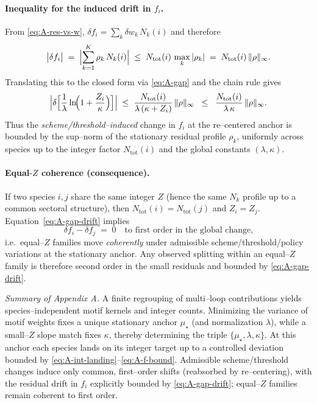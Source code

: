 \documentclass[epjc3]{svjour3}
\begin{document}
\paragraph{Inequality for the induced drift in $f_i$.}
From \eqref{eq:A-res-vs-w}, $\delta f_i=\sum_k \delta w_k\,N_k(i)$ and therefore
\begin{equation}
  \bigl|\delta f_i\bigr|
  \;=\;\Bigl|\sum_{k=1}^K \rho_k\,N_k(i)\Bigr|
  \;\le\; N_{\mathrm{tot}}(i)\,\max_k|\rho_k|
  \;=\;N_{\mathrm{tot}}(i)\,\|\rho\|_{\infty}.
  \label{eq:A-fi-drift}
\end{equation}
Translating this to the closed form via \eqref{eq:A-gap} and the chain rule gives
\begin{equation}
  \Bigl|\delta\Bigl[\frac{1}{\lambda}\ln\!\Bigl(1+\frac{Z_i}{\kappa}\Bigr)\Bigr]\Bigr|
  \;\le\;\frac{N_{\mathrm{tot}}(i)}{\lambda\,(\kappa+Z_i)}\,\|\rho\|_{\infty}
  \;\;\le\;\;\frac{N_{\mathrm{tot}}(i)}{\lambda\,\kappa}\,\|\rho\|_{\infty}.
  \label{eq:A-gap-drift}
\end{equation}
Thus the \emph{scheme/threshold--induced} change in $f_i$ at the re--centered anchor is bounded by the sup--norm of the stationary residual profile $\rho_k$, uniformly across species up to the integer factor $N_{\mathrm{tot}}(i)$ and the global constants $(\lambda,\kappa)$.

\paragraph{Equal\texorpdfstring{$\text{-}Z$}{-Z} coherence (consequence).}
If two species $i,j$ share the same integer $Z$ (hence the same $N_k$ profile up to a common sectoral structure), then $N_{\mathrm{tot}}(i)=N_{\mathrm{tot}}(j)$ and $Z_i=Z_j$. Equation~\eqref{eq:A-gap-drift} implies
\begin{equation}
  \delta f_i-\delta f_j\;=\;0\quad\text{to first order in the global change,}
  \label{eq:A-equalZ-coherence}
\end{equation}
i.e.\ equal--$Z$ families move \emph{coherently} under admissible scheme/threshold/policy variations at the stationary anchor. Any observed splitting within an equal--$Z$ family is therefore second order in the small residuals and bounded by \eqref{eq:A-gap-drift}.

\medskip\noindent
\emph{Summary of Appendix A.} A finite regrouping of multi--loop contributions yields species--independent motif kernels and integer counts. Minimizing the variance of motif weights fixes a unique stationary anchor $\mu_\star$ (and normalization $\lambda$), while a small--$Z$ slope match fixes $\kappa$, thereby determining the triple $\{\mu_\star,\lambda,\kappa\}$. At this anchor each species lands on its integer target up to a controlled deviation bounded by \eqref{eq:A-int-landing}--\eqref{eq:A-f-bound}. Admissible scheme/threshold changes induce only common, first--order shifts (reabsorbed by re--centering), with the residual drift in $f_i$ explicitly bounded by \eqref{eq:A-gap-drift}; equal--$Z$ families remain coherent to first order.
\end{document}
